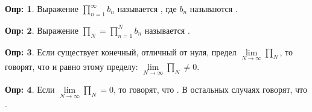 \documentclass[12pt]{article}
\theoremstyle{definition}
\newtheorem{defn}{Опр:}
\begin{document}
\begin{defn}
	Выражение $\displaystyle \prod\limits_{n=1}^{\infty}b_n$ называется , где $b_n$ называются .
\end{defn}
\begin{defn}
	Выражение $ \prod_N = \displaystyle \prod\limits_{n=1}^{N}b_n$ называется .
\end{defn}

\begin{defn}
	Если существует конечный, отличный от нуля, предел $\lim\limits_{N \to \infty}  \prod_N$, то говорят, что  и равно этому пределу: $\lim\limits_{N \to \infty}  \prod_N \neq 0$.
\end{defn}
\begin{defn}
	Если $\lim\limits_{N \to \infty}  \prod_N = 0$, то говорят, что . В остальных случаях говорят, что  . 
\end{defn}
\end{document}
